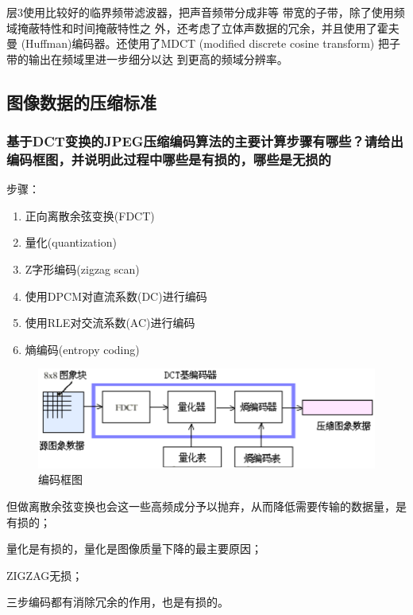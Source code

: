 \documentclass[UTF8,a4paper,AutoFakeBold,AutoFakeSlant]{ctexart}
\begin{document}
层3使用比较好的临界频带滤波器，把声音频带分成非等
带宽的子带，除了使用频域掩蔽特性和时间掩蔽特性之
外，还考虑了立体声数据的冗余，并且使用了霍夫曼
(Huffman)编码器。还使用了MDCT (modified discrete 
cosine transform) 把子带的输出在频域里进一步细分以达
到更高的频域分辨率。





\subsection{图像数据的压缩标准}

\subsubsection{基于DCT变换的JPEG压缩编码算法的主要计算步骤有哪些？请给出编码框图，并说明此过程中哪些是有损的，哪些是无损的}

步骤：
\begin{enumerate}
	\item 正向离散余弦变换(FDCT)
	\item 量化(quantization)
	\item Z字形编码(zigzag scan) 
	\item 使用DPCM对直流系数(DC)进行编码
	\item 使用RLE对交流系数(AC)进行编码
	\item 熵编码(entropy coding)
\end{enumerate}
\begin{figure}[H]
	\centering
	\includegraphics[scale=0.375]{dct.png}
	\caption{编码框图}
	\label{f:编码框图}
\end{figure}

但做离散余弦变换也会这一些高频成分予以抛弃，从而降低需要传输的数据量，是有损的；

量化是有损的，量化是图像质量下降的最主要原因；

ZIGZAG无损；

三步编码都有消除冗余的作用，也是有损的。
\end{document}
